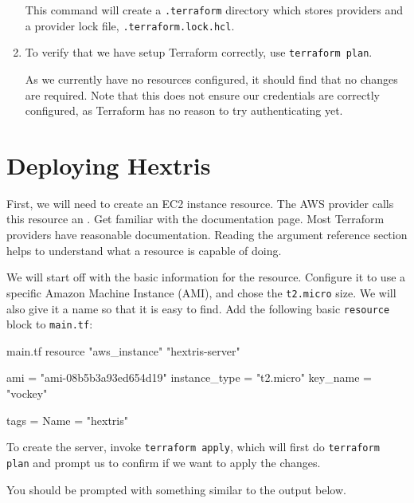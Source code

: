 \documentclass{csse4400}
\begin{document}
\begin{enumerate}
This command will create a \texttt{.terraform} directory which stores providers and a provider lock file, \texttt{.terraform.lock.hcl}.

\item To verify that we have setup Terraform correctly, use \texttt{terraform plan}.

As we currently have no resources configured, it should find that no changes are required.
Note that this does not ensure our credentials are correctly configured, as Terraform has no reason to try authenticating yet.

\end{enumerate}


\section{Deploying Hextris}
First, we will need to create an EC2 instance resource.
The AWS provider calls this resource an .
Get familiar with the documentation page.
Most Terraform providers have reasonable documentation.
Reading the argument reference section helps to understand what a resource is capable of doing.

We will start off with the basic information for the resource.
Configure it to use a specific Amazon Machine Instance (AMI), and chose the \texttt{t2.micro} size.
We will also give it a name so that it is easy to find.
Add the following basic \texttt{resource} block to \texttt{main.tf}:

\begin{code}[language=terraform,numbers=none]{main.tf}
resource "aws_instance" "hextris-server" {
    ami           = "ami-08b5b3a93ed654d19"
    instance_type = "t2.micro"
    key_name      = "vockey"
    
    tags = {
        Name = "hextris"
    }
}      
\end{code}

To create the server, invoke \texttt{terraform apply},
which will first do \texttt{terraform plan} and prompt us to confirm if we want to apply the changes.


You should be prompted with something similar to the output below.
\end{document}
